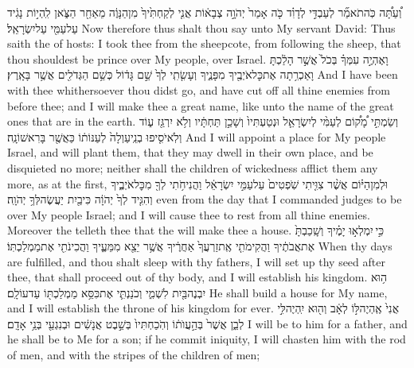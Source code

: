 {וְ֠עַתָּ֠ה כֹּֽה\maqqaf תֹאמַ֞ר לְעַבְדִּ֣י לְדָוִ֗ד כֹּ֤ה אָמַר֙ יְהֹוָ֣ה צְבָא֔וֹת אֲנִ֤י לְקַחְתִּ֙יךָ֙ מִן\maqqaf הַנָּוֶ֔ה מֵאַחַ֖ר הַצֹּ֑אן לִֽהְי֣וֹת נָגִ֔יד עַל\maqqaf עַמִּ֖י עַל\maqqaf יִשְׂרָאֵֽל׃}
{Now therefore thus shalt thou say unto My servant David: Thus saith the \lord\space of hosts: I took thee from the sheepcote, from following the sheep, that thou shouldest be prince over My people, over Israel.}
{וָאֶהְיֶ֣ה עִמְּךָ֗ בְּכֹל֙ אֲשֶׁ֣ר הָלַ֔כְתָּ וָאַכְרִ֥תָה אֶת\maqqaf כׇּל\maqqaf אֹיְבֶ֖יךָ מִפָּנֶ֑יךָ וְעָשִׂ֤תִֽי לְךָ֙ שֵׁ֣ם גָּד֔וֹל כְּשֵׁ֥ם הַגְּדֹלִ֖ים אֲשֶׁ֥ר בָּאָֽרֶץ׃}
{And I have been with thee whithersoever thou didst go, and have cut off all thine enemies from before thee; and I will make thee a great name, like unto the name of the great ones that are in the earth.}
{וְשַׂמְתִּ֣י מָ֠ק֠וֹם לְעַמִּ֨י לְיִשְׂרָאֵ֤ל וּנְטַעְתִּיו֙ וְשָׁכַ֣ן תַּחְתָּ֔יו וְלֹ֥א יִרְגַּ֖ז ע֑וֹד וְלֹֽא\maqqaf יֹסִ֤יפוּ בְנֵֽי\maqqaf עַוְלָה֙ לְעַנּוֹת֔וֹ כַּאֲשֶׁ֖ר בָּרִאשׁוֹנָֽה׃}
{And I will appoint a place for My people Israel, and will plant them, that they may dwell in their own place, and be disquieted no more; neither shall the children of wickedness afflict them any more, as at the first,}
{וּלְמִן\maqqaf הַיּ֗וֹם אֲשֶׁ֨ר צִוִּ֤יתִי שֹֽׁפְטִים֙ עַל\maqqaf עַמִּ֣י יִשְׂרָאֵ֔ל וַהֲנִיחֹ֥תִי לְךָ֖ מִכׇּל\maqqaf אֹיְבֶ֑יךָ וְהִגִּ֤יד לְךָ֙ יְהֹוָ֔ה כִּי\maqqaf בַ֖יִת יַעֲשֶׂה\maqqaf לְּךָ֥ יְהֹוָֽה׃}
{even from the day that I commanded judges to be over My people Israel; and I will cause thee to rest from all thine enemies. Moreover the \lord\space telleth thee that the \lord\space will make thee a house.}
{כִּ֣י \legarmeh  יִמְלְא֣וּ יָמֶ֗יךָ וְשָֽׁכַבְתָּ֙ אֶת\maqqaf אֲבֹתֶ֔יךָ וַהֲקִימֹתִ֤י אֶֽת\maqqaf זַרְעֲךָ֙ אַחֲרֶ֔יךָ אֲשֶׁ֥ר יֵצֵ֖א מִמֵּעֶ֑יךָ וַהֲכִינֹתִ֖י אֶת\maqqaf מַמְלַכְתּֽוֹ׃}
{When thy days are fulfilled, and thou shalt sleep with thy fathers, I will set up thy seed after thee, that shall proceed out of thy body, and I will establish his kingdom.}
{ה֥וּא יִבְנֶה\maqqaf בַּ֖יִת לִשְׁמִ֑י וְכֹנַנְתִּ֛י אֶת\maqqaf כִּסֵּ֥א מַמְלַכְתּ֖וֹ עַד\maqqaf עוֹלָֽם׃}
{He shall build a house for My name, and I will establish the throne of his kingdom for ever.}
{אֲנִי֙ אֶֽהְיֶה\maqqaf לּ֣וֹ לְאָ֔ב וְה֖וּא יִֽהְיֶה\maqqaf לִּ֣י לְבֵ֑ן אֲשֶׁר֙ בְּהַ֣עֲוֺת֔וֹ וְהֹֽכַחְתִּיו֙ בְּשֵׁ֣בֶט אֲנָשִׁ֔ים וּבְנִגְעֵ֖י בְּנֵ֥י אָדָֽם׃}
{I will be to him for a father, and he shall be to Me for a son; if he commit iniquity, I will chasten him with the rod of men, and with the stripes of the children of men;}
